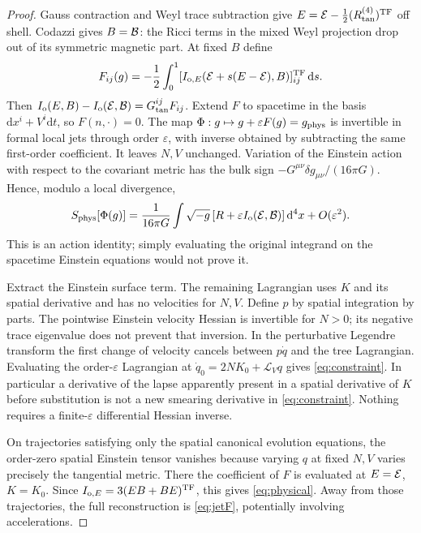 \documentclass[11pt]{article}
\newcommand{\dd}{\mathrm d}
\newcommand{\eps}{\varepsilon}
\newcommand{\TF}{\mathrm{TF}}
\newcommand{\Lie}{\mathcal L}
\newcommand{\GN}{16\pi G}
\begin{document}
\begin{proof}
Gauss contraction and Weyl trace subtraction give \(E={\cal E}-\tfrac12(R^{(4)}_{\rm tan})^{\TF}\) off shell. Codazzi gives \(B={\cal B}\): the Ricci terms in the mixed Weyl projection drop out of its symmetric magnetic part. At fixed \(B\) define
\begin{equation}
 F_{ij}(g)=-\frac12\int_0^1
        [I_{{\rm o},E}({\cal E}+s(E-{\cal E}),B)]^{\TF}_{ij}\,\dd s .
 \label{eq:jetF}
\end{equation}
Then \(I_{\rm o}(E,B)-I_{\rm o}({\cal E},{\cal B})=G^{ij}_{\rm tan}F_{ij}\). Extend \(F\) to spacetime in the basis \(\dd x^i+V^i\dd t\), so \(F(n,\cdot)=0\). The map
\(\Phi:g\mapsto g+\eps F(g)=g_{\rm phys}\) is invertible in formal local jets through order \(\eps\), with inverse obtained by subtracting the same first-order coefficient. It leaves \(N,V\) unchanged. Variation of the Einstein action with respect to the covariant metric has the bulk sign \(-G^{\mu\nu}\delta g_{\mu\nu}/(\GN)\). Hence, modulo a local divergence,
\begin{equation}
 S_{\rm phys}[\Phi(g)]=
 \frac1{\GN}\int\sqrt{-g}\,[R+\eps I_{\rm o}({\cal E},{\cal B})]\,\dd^4x
 +O(\eps^2).
 \label{eq:actionid}
\end{equation}
This is an action identity; simply evaluating the original integrand on the spacetime Einstein equations would not prove it.

Extract the Einstein surface term. The remaining Lagrangian uses \(K\) and its spatial derivative and has no velocities for \(N,V\). Define \(p\) by spatial integration by parts. The pointwise Einstein velocity Hessian is invertible for \(N>0\); its negative trace eigenvalue does not prevent that inversion. In the perturbative Legendre transform the first change of velocity cancels between \(p\dot q\) and the tree Lagrangian. Evaluating the order-\(\eps\) Lagrangian at \(\dot q_0=2NK_0+\Lie_Vq\) gives \eqref{eq:constraint}. In particular a derivative of the lapse apparently present in a spatial derivative of \(K\) before substitution is not a new smearing derivative in \eqref{eq:constraint}. Nothing requires a finite-\(\eps\) differential Hessian inverse.

On trajectories satisfying only the spatial canonical evolution equations, the order-zero spatial Einstein tensor vanishes because varying \(q\) at fixed \(N,V\) varies precisely the tangential metric. There the coefficient of \(F\) is evaluated at \(E={\cal E}\), \(K=K_0\). Since \(I_{{\rm o},E}=3(EB+BE)^{\TF}\), this gives \eqref{eq:physical}. Away from those trajectories, the full reconstruction is \eqref{eq:jetF}, potentially involving accelerations.


\end{proof}
\end{document}
